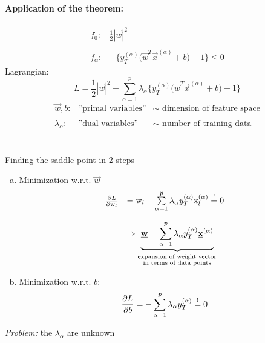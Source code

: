 \paragraph{Application of the theorem:}
\[ \begin{array}{ll}
	f_0: & \frac{1}{2} | \vec{w} |^2 \\\\
	f_\alpha: & - \Big\{ y_T^{(\alpha)} \Big( \vec{w}^T \vec{x}^{(\alpha)}
		+ b \Big) -1 \Big\} \leq 0
\end{array} \]
Lagrangian:
\begin{equation}\label{eq:lagrangianLinSep}
	L = \frac{1}{2} | \vec{w} |^2 
	- \sum_{\alpha = 1}^p \lambda_\alpha \Big\{ y_T^{(\alpha)} 
		\Big( \vec{w}^T \vec{x}^{(\alpha)} + b \Big) - 1 \Big\} 
\end{equation}
\[ \begin{array}{lll}
	\vec{w}, b: & \text{''primal variables''} 
		& \sim \text{ dimension of feature space} \\\\
	\lambda_\alpha: & \text{''dual variables''} 
		& \sim \text{ number of training data}
\end{array} \]\\\\
Finding the saddle point in 2 steps
\begin{enumerate}[(a)]
\item Minimization w.r.t. $\vec{w}$
\begin{equation}
	\begin{array}{ll}
	\frac{\partial L}{\partial \mathrm{w}_l}
	& 	= \mathrm{w}_l - \sum\limits_{\alpha = 1}^p \lambda_\alpha
		y_T^{(\alpha)} \mathrm{x}_l^{(\alpha)} \stackrel{\mathrm{!}}{=} 0 \\\\
	& \Rightarrow \underbrace{
		\underline{\mathbf{w}} = \sum_{\alpha = 1}^p \lambda_\alpha 
		y_T^{(\alpha)} \underline{\mathbf{x}}^{(\alpha)} }_{
			\substack{	\text{expansion of weight vector} \\
					\text{in terms of data points}}}
	\end{array}
\end{equation}
\item Minimization w.r.t. $b$:
\begin{equation}
	\frac{\partial L}{\partial b}
	= -\sum_{\alpha = 1}^p \lambda_\alpha y_T^{(\alpha)} \stackrel{\mathrm{!}}{=} 0
\end{equation}
\end{enumerate}
\emph{Problem:} the $\lambda_\alpha$ are unknown\\\\
